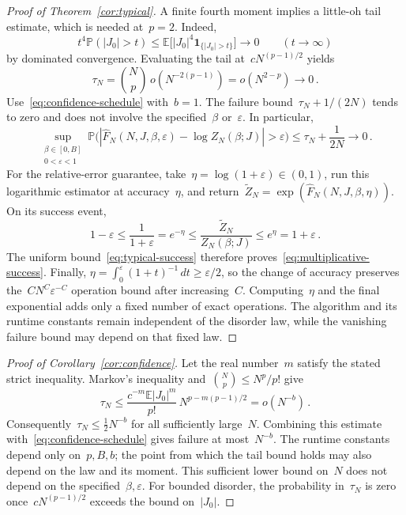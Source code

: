 \documentclass[10pt]{article}
\theoremstyle{plain}
\theoremstyle{definition}
\theoremstyle{remark}
\begin{document}
\begin{proof}[Proof of Theorem~\ref{cor:typical}]
A finite fourth moment implies a little-oh tail estimate, which is needed at~$p=2$. Indeed,
\begin{equation*}
 t^4\mathbb P(|J_0|>t)
 \le\mathbb E\bigl[|J_0|^4\mathbf1_{\{|J_0|>t\}}\bigr]\longrightarrow0
 \qquad(t\longrightarrow\infty)
\end{equation*}
by dominated convergence. Evaluating the tail at~$cN^{(p-1)/2}$ yields
\begin{equation*}
 \tau_N=\binom Np\,o(N^{-2(p-1)})=o(N^{2-p})\longrightarrow0\,.
\end{equation*}
Use~\eqref{eq:confidence-schedule} with~$b=1$. The failure bound~$\tau_N+1/(2N)$ tends to zero and does not involve the specified~$\beta$ or~$\varepsilon$. In particular,
\begin{equation}\label{eq:typical-success}
 \sup_{\substack{\beta\in[0,B]\\0<\varepsilon<1}}
 \mathbb P\bigl(|\widehat F_N(N,J,\beta,\varepsilon)-\log Z_N(\beta;J)|>\varepsilon\bigr)
 \le\tau_N+\frac1{2N}\longrightarrow0\,.
\end{equation}
For the relative-error guarantee, take~$\eta=\log(1+\varepsilon)\in(0,1)$, run this logarithmic estimator at accuracy~$\eta$, and return~$\widetilde Z_N=\exp(\widehat F_N(N,J,\beta,\eta))$. On its success event,
\begin{equation*}
 1-\varepsilon\le\frac1{1+\varepsilon}
 =e^{-\eta}\le\frac{\widetilde Z_N}{Z_N(\beta;J)}
 \le e^\eta=1+\varepsilon\,.
\end{equation*}
The uniform bound~\eqref{eq:typical-success} therefore proves~\eqref{eq:multiplicative-success}. Finally, $\eta=\int_0^\varepsilon(1+t)^{-1}\,dt\ge\varepsilon/2$, so the change of accuracy preserves the~$CN^C\varepsilon^{-C}$ operation bound after increasing~$C$. Computing~$\eta$ and the final exponential adds only a fixed number of exact operations. The algorithm and its runtime constants remain independent of the disorder law, while the vanishing failure bound may depend on that fixed law.
\end{proof}

\begin{proof}[Proof of Corollary~\ref{cor:confidence}]
Let the real number~$m$ satisfy the stated strict inequality. Markov's inequality and~$\binom Np\le N^p/p!$ give
\begin{equation*}
 \tau_N\le\frac{c^{-m}\mathbb E|J_0|^m}{p!}\,
 N^{p-m(p-1)/2}=o(N^{-b})\,.
\end{equation*}
Consequently~$\tau_N\le\tfrac12N^{-b}$ for all sufficiently large~$N$. Combining this estimate with~\eqref{eq:confidence-schedule} gives failure at most~$N^{-b}$. The runtime constants depend only on~$p,B,b$; the point from which the tail bound holds may also depend on the law and its moment. This sufficient lower bound on~$N$ does not depend on the specified~$\beta,\varepsilon$. For bounded disorder, the probability in~$\tau_N$ is zero once~$cN^{(p-1)/2}$ exceeds the bound on~$|J_0|$.
\end{proof}
\end{document}
